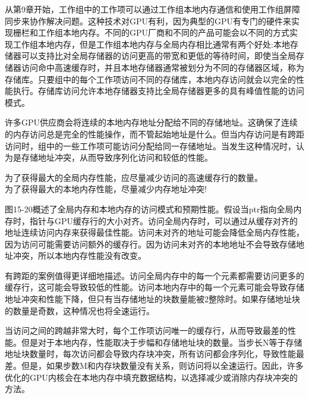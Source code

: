 从第9章开始，工作组中的工作项可以通过工作组本地内存通信和使用工作组屏障同步来协作解决问题。这种技术对GPU有利，因为典型的GPU有专门的硬件来实现栅栏和工作组本地内存。不同的GPU厂商和不同的产品可能会以不同的方式实现工作组本地内存，但是工作组本地内存与全局内存相比通常有两个好处:本地存储器可以支持比对全局存储器的访问更高的带宽和更低的等待时间，即使当全局存储器访问命中高速缓存时，并且本地存储器通常被划分为不同的存储器区域，称为存储库。只要组中的每个工作项访问不同的存储库，本地内存访问就会以完全的性能执行。存储库访问允许本地存储器支持比全局存储器更多的具有峰值性能的访问模式。\par

许多GPU供应商会将连续的本地内存地址分配给不同的存储地址。这确保了连续的内存访问总是完全的性能操作，而不管起始地址是什么。但当内存访问是有跨距访问时，组中的一些工作项可能访问分配给同一存储地址。当发生这种情况时，认为是存储地址冲突，从而导致序列化访问和较低的性能。\par

\begin{tcolorbox}[colback=red!5!white,colframe=red!75!black]
为了获得最大的全局内存性能，应尽量减少访问的高速缓存行的数量。\\

为了获得最大的本地内存性能，尽量减少内存地址冲突!
\end{tcolorbox}

图15-20概述了全局内存和本地内存的访问模式和预期性能。假设当ptr指向全局内存时，指针与GPU缓存行的大小对齐。访问全局内存时，可以通过从缓存对齐的地址连续访问内存来获得最佳性能。访问未对齐的地址可能会降低全局内存性能，因为访问可能需要访问额外的缓存行。因为访问未对齐的本地地址不会导致存储地址冲突，所以本地内存性能没有改变。\par

有跨距的案例值得更详细地描述。访问全局内存中的每一个元素都需要访问更多的缓存行，这可能会导致较低的性能。访问本地内存中的每一个元素可能会导致存储地址冲突和性能下降，但只有当存储地址的块数量能被2整除时。如果存储地址块的数量是奇数，这种情况也将全速运行。\par

当访问之间的跨越非常大时，每个工作项访问唯一的缓存行，从而导致最差的性能。但是对于本地内存，性能取决于步幅和存储地址块的数量。当步长N等于存储地址块数量时，每次访问都会导致内存块冲突，所有访问都会序列化，导致性能最差。但是，如果步数M和内存块数量没有关系，则访问将以全速运行。因此，许多优化的GPU内核会在本地内存中填充数据结构，以选择减少或消除内存块冲突的方法。\par

